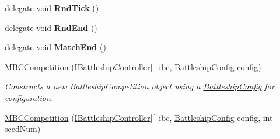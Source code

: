 \begin{DoxyCompactItemize}
\item 
\hypertarget{class_m_b_c_core_1_1_m_b_c_competition_af391a040b1c04e2816bbb8ec0457bc2c}{delegate void {\bfseries Rnd\-Tick} ()}\label{class_m_b_c_core_1_1_m_b_c_competition_af391a040b1c04e2816bbb8ec0457bc2c}

\item 
\hypertarget{class_m_b_c_core_1_1_m_b_c_competition_a8b01ecca9be05f4acfb982826836a136}{delegate void {\bfseries Rnd\-End} ()}\label{class_m_b_c_core_1_1_m_b_c_competition_a8b01ecca9be05f4acfb982826836a136}

\item 
\hypertarget{class_m_b_c_core_1_1_m_b_c_competition_a9ede05c17f5871ad6f3fe6cc91c252cf}{delegate void {\bfseries Match\-End} ()}\label{class_m_b_c_core_1_1_m_b_c_competition_a9ede05c17f5871ad6f3fe6cc91c252cf}

\item 
\hypertarget{class_m_b_c_core_1_1_m_b_c_competition_a76e6fd030bd80ff2f185a412cac0acb3}{\hyperlink{class_m_b_c_core_1_1_m_b_c_competition_a76e6fd030bd80ff2f185a412cac0acb3}{M\-B\-C\-Competition} (\hyperlink{interface_m_b_c_core_1_1_i_battleship_controller}{I\-Battleship\-Controller}\mbox{[}$\,$\mbox{]} ibc, \hyperlink{class_m_b_c_core_1_1_battleship_config}{Battleship\-Config} config)}\label{class_m_b_c_core_1_1_m_b_c_competition_a76e6fd030bd80ff2f185a412cac0acb3}

\begin{DoxyCompactList}\small\item\em Constructs a new Battleship\-Competition object using a \hyperlink{class_m_b_c_core_1_1_battleship_config}{Battleship\-Config} for configuration.\end{DoxyCompactList}\item 
\hypertarget{class_m_b_c_core_1_1_m_b_c_competition_ab2c47a712f396b032812151e1f4bcc65}{\hyperlink{class_m_b_c_core_1_1_m_b_c_competition_ab2c47a712f396b032812151e1f4bcc65}{M\-B\-C\-Competition} (\hyperlink{interface_m_b_c_core_1_1_i_battleship_controller}{I\-Battleship\-Controller}\mbox{[}$\,$\mbox{]} ibc, \hyperlink{class_m_b_c_core_1_1_battleship_config}{Battleship\-Config} config, int seed\-Num)}\label{class_m_b_c_core_1_1_m_b_c_competition_ab2c47a712f396b032812151e1f4bcc65}


\end{DoxyCompactItemize}
